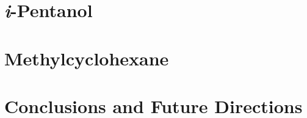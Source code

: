 \documentclass[12pt,letterpaper,oneside,final]{book}
\begin{document}
\chapter{\textit{i}-Pentanol}
\label{chap:peoh}

\cleardoublepage

\chapter{Methylcyclohexane}
\label{chap:mch}

\cleardoublepage

\chapter{Conclusions and Future Directions}
\label{chap:conclusions}

\cleardoublepage

\printbibliography[heading=bibintoc]
\end{document}
